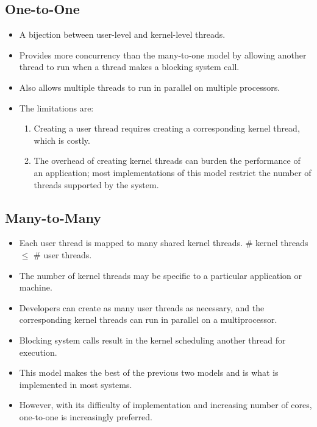 \documentclass[10pt]{report}
\begin{document}
\subsection{One-to-One}
\begin{itemize}
\item A bijection between user-level and kernel-level threads.
\item Provides more concurrency than the many-to-one model by allowing another thread to run when a thread makes a blocking system call.
\item Also allows multiple threads to run in parallel on multiple processors.
\item The limitations are:
\begin{enumerate}
\item Creating a user thread requires creating a corresponding kernel thread, which is costly.
\item The overhead of creating kernel threads can burden the performance of an application; most implementations of this model restrict the number of threads supported by the system.
\end{enumerate}
\end{itemize}
\subsection{Many-to-Many}
\begin{itemize}
\item Each user thread is mapped to many shared kernel threads. \# kernel threads $\le$ \# user threads.
\item The number of kernel threads may be specific to a particular application or machine.
\item Developers can create as many user threads as necessary, and the corresponding kernel threads can run in parallel on a multiprocessor.
\item Blocking system calls result in the kernel scheduling another thread for execution.
\item This model makes the best of the previous two models and is what is implemented in most systems.
\item However, with its difficulty of implementation and increasing number of cores, one-to-one is increasingly preferred.
\end{itemize}
\end{document}
